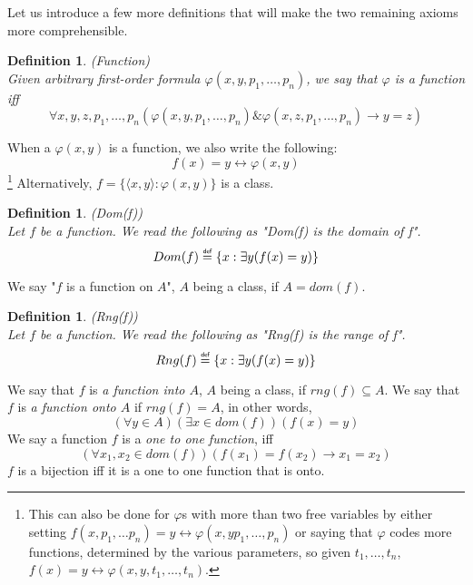 \documentclass[12pt,a4paper]{article}
\newtheorem{definition}[theorem]{Definition}
\renewcommand{\iff}{\leftrightarrow}
\newcommand{\then}{\rightarrow}
\newcommand{\et}{\mathrel{\&}}
\newcommand\defeq{\mathrel{\overset{\makebox[0pt]{\mbox{\normalfont\tiny\sffamily def}}}{=}}}
\begin{document}
Let us introduce a few more definitions that will make the two remaining axioms more comprehensible.
\begin{definition}{(Function)}\label{def:function}\\
Given arbitrary first-order formula $\varphi(x, y, p_1, \ldots, p_n)$, we say that $\varphi$ is a function iff
\begin{equation}\label{def:function_formula}
\forall x, y, z, p_1, \ldots, p_n (\varphi(x, y, p_1, \ldots, p_n) \et \varphi(x, z, p_1, \ldots, p_n) \then y = z)
\end{equation}
\end{definition}
When a $\varphi(x, y)$ is a function, we also write the following:
\begin{equation}
f(x) = y \iff \varphi(x, y)
\end{equation}
\footnote{This can also be done for $\varphi$s with more than two free variables by either setting $f(x, p_1, \ldots p_n) = y \iff \varphi(x, y p_1, \ldots, p_n)$ or saying that $\varphi$ codes more functions, determined by the various parameters, so given $t_1, \ldots, t_n$, $f(x) = y \iff \varphi(x, y, t_1, \ldots, t_n)$.}
Alternatively, $f = \{\langle x, y \rangle : \varphi(x, y)\}$ is a class.


\begin{definition}{(Dom(f))}\label{def:dom}\\
Let $f$ be a function. We read the following as "Dom(f) is the domain of f".
\begin{equation}
Dom(f) \defeq \{x : \exists y (f(x) = y)\}
\end{equation}
\end{definition}
We say "$f$ is a function on $A$", $A$ being a class, if $A = dom(f)$.

\begin{definition}{(Rng(f))}\label{def:rng}\\
Let $f$ be a function. We read the following as "Rng(f) is the range of f".
\begin{equation}
Rng(f) \defeq \{x : \exists y (f(x) = y)\}
\end{equation}
\end{definition}
We say that $f$ is \emph{a function into $A$}, $A$ being a class, if $rng(f) \subseteq A$.
We say that $f$ is \emph{a function onto $A$} if $rng(f) = A$, in other words,
\begin{equation}
(\forall y \in A)(\exists x \in dom(f))(f(x) = y)
\end{equation}
We say a function $f$ is a \emph{one to one function}, iff
\begin{equation}
(\forall x_1, x_2 \in dom(f))(f(x_1) = f(x_2) \then x_1 = x_2)
\end{equation}
$f$ is a bijection iff it is a one to one function that is onto.
\end{document}
